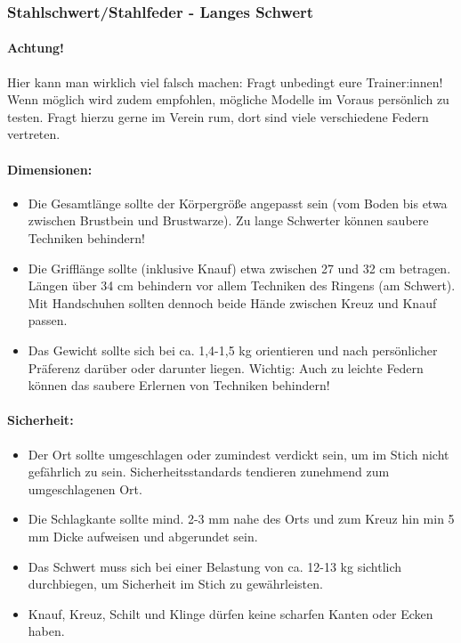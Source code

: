 \newpage

\subsubsection*{Stahlschwert/Stahlfeder - Langes Schwert}

\paragraph{Achtung!}
Hier kann man wirklich viel falsch machen: Fragt unbedingt eure Trainer:innen!
Wenn möglich wird zudem empfohlen, mögliche Modelle im Voraus persönlich zu testen.
Fragt hierzu gerne im Verein rum, dort sind viele verschiedene Federn vertreten.

\paragraph{Dimensionen:}
\begin{itemize}
    \item Die Gesamtlänge sollte der Körpergröße angepasst sein (vom Boden bis etwa zwischen Brustbein und Brustwarze).
        Zu lange Schwerter können saubere Techniken behindern!
    \item Die Grifflänge sollte (inklusive Knauf) etwa zwischen 27 und 32 cm betragen.
        Längen über 34 cm behindern vor allem Techniken des Ringens (am Schwert).
        Mit Handschuhen sollten dennoch beide Hände zwischen Kreuz und Knauf passen.
    \item Das Gewicht sollte sich bei ca. 1,4-1,5 kg orientieren und nach persönlicher Präferenz darüber oder darunter liegen.
        Wichtig: Auch zu leichte Federn können das saubere Erlernen von Techniken behindern!
\end{itemize}

\paragraph{Sicherheit:}
\begin{itemize}
    \item Der Ort sollte umgeschlagen oder zumindest verdickt sein, um im Stich nicht gefährlich zu sein.
        Sicherheitsstandards tendieren zunehmend zum umgeschlagenen Ort.
    \item Die Schlagkante sollte mind. 2-3 mm nahe des Orts und zum Kreuz hin min 5 mm Dicke aufweisen und abgerundet sein.
    \item Das Schwert muss sich bei einer Belastung von ca. 12-13 kg sichtlich durchbiegen, um Sicherheit im Stich zu gewährleisten.
    \item Knauf, Kreuz, Schilt und Klinge dürfen keine scharfen Kanten oder Ecken haben.
\end{itemize}

